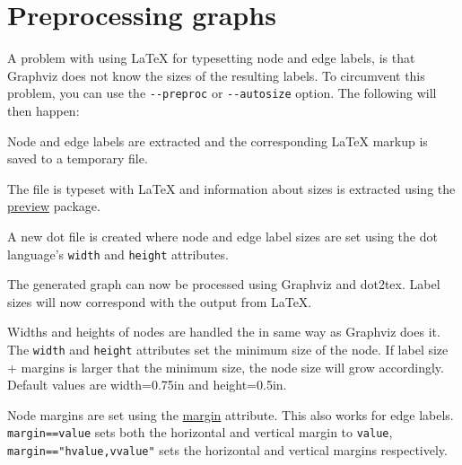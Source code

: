 \documentclass[10pt,a4paper,english]{article}
\newlength{\admonitionwidth}
\begin{document}

\hypertarget{preprocessing-graphs}{}
\section*{Preprocessing graphs}
\label{preprocessing-graphs}

A problem with using LaTeX for typesetting node and edge labels, is that Graphviz does not know the sizes of the resulting labels. To circumvent this problem, you can use the \texttt{-{}-preproc} or \texttt{-{}-autosize} option. The following will then happen:
\begin{list}{.}
{
\setlength{\rightmargin}{\leftmargin}
}
\item {} 
Node and edge labels are extracted and the corresponding LaTeX markup is saved to a temporary file.

\item {} 
The file is typeset with LaTeX and information about sizes is extracted using the \href{http://www.ctan.org/tex-archive/help/Catalogue/entries/preview.html}{preview} package.

\item {} 
A new dot file is created where node and edge label sizes are set using the dot language's \texttt{width} and \texttt{height} attributes.

\item {} 
The generated graph can now be processed using Graphviz and dot2tex. Label sizes will now correspond with the output from LaTeX.

\end{list}

Widths and heights of nodes are handled the in same way as Graphviz does it. The \texttt{width} and \texttt{height} attributes set the minimum size of the node. If label size + margins is larger that the minimum size, the node size will grow accordingly. Default values are width=0.75in and height=0.5in.

Node margins are set using the \href{http://graphviz.org/doc/info/attrs.html\#d:margin}{margin} attribute. This also works for edge labels. \texttt{margin==value} sets both the horizontal and vertical margin to \texttt{value}, \texttt{margin=="hvalue,vvalue"} sets the horizontal and vertical margins respectively.
\begin{center}\begin{sffamily}
\end{sffamily}
\end{center}
\end{document}

